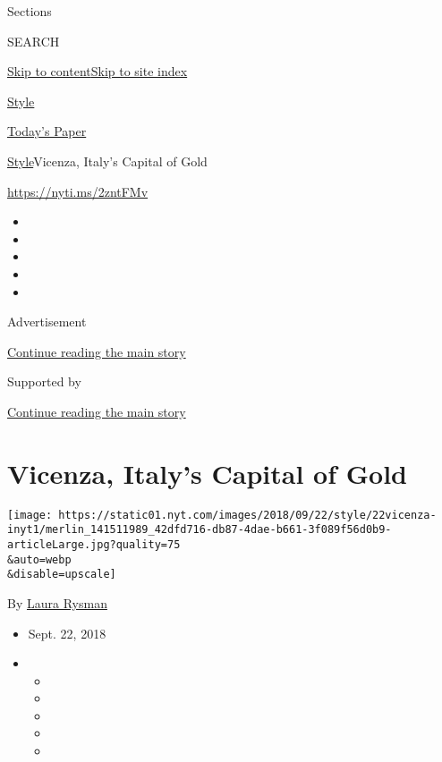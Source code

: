 Sections

SEARCH

\protect\hyperlink{site-content}{Skip to
content}\protect\hyperlink{site-index}{Skip to site index}

\href{https://www.nytimes.com/section/style}{Style}

\href{https://myaccount.nytimes.com/auth/login?response_type=cookie\&client_id=vi}{}

\href{https://www.nytimes.com/section/todayspaper}{Today's Paper}

\href{/section/style}{Style}\textbar{}Vicenza, Italy's Capital of Gold

\href{https://nyti.ms/2zntFMv}{https://nyti.ms/2zntFMv}

\begin{itemize}
\item
\item
\item
\item
\item
\end{itemize}

Advertisement

\protect\hyperlink{after-top}{Continue reading the main story}

Supported by

\protect\hyperlink{after-sponsor}{Continue reading the main story}

\hypertarget{vicenza-italys-capital-of-gold}{%
\section{Vicenza, Italy's Capital of
Gold}\label{vicenza-italys-capital-of-gold}}

\texttt{[image: https://static01.nyt.com/images/2018/09/22/style/22vicenza-inyt1/merlin\_141511989\_42dfd716-db87-4dae-b661-3f089f56d0b9-articleLarge.jpg?quality=75\\\&auto=webp\\\&disable=upscale]}

By \href{https://www.nytimes.com/by/laura-rysman}{Laura Rysman}

\begin{itemize}
\item
  Sept. 22, 2018
\item
  \begin{itemize}
  \item
  \item
  \item
  \item
  \item
  \end{itemize}
\end{itemize}

